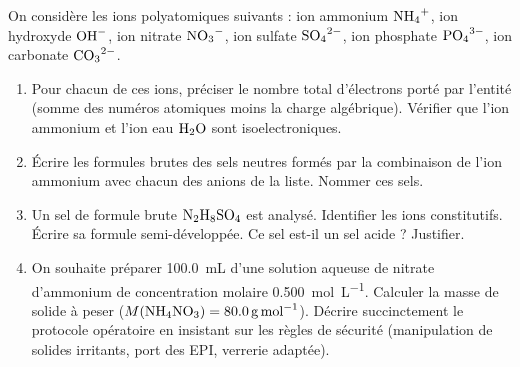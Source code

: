 \documentclass[11pt]{article}
\begin{document}
\begin{exercice}
On considère les ions polyatomiques suivants : ion ammonium $\ce{NH4+}$, ion hydroxyde $\ce{OH-}$, ion nitrate $\ce{NO3-}$, ion sulfate $\ce{SO4^{2-}}$, ion phosphate $\ce{PO4^{3-}}$, ion carbonate $\ce{CO3^{2-}}$.
\begin{enumerate}
    \item Pour chacun de ces ions, préciser le nombre total d'électrons porté par l'entité (somme des numéros atomiques moins la charge algébrique). Vérifier que l'ion ammonium et l'ion eau $\ce{H2O}$ sont isoelectroniques.
    \item Écrire les formules brutes des sels neutres formés par la combinaison de l'ion ammonium avec chacun des anions de la liste. Nommer ces sels.
    \item Un sel de formule brute $\ce{N2H8SO4}$ est analysé. Identifier les ions constitutifs. Écrire sa formule semi-développée. Ce sel est-il un sel acide ? Justifier.
    \item On souhaite préparer \SI{100,0}{mL} d'une solution aqueuse de nitrate d'ammonium de concentration molaire \SI{0,500}{mol.L^{-1}}. Calculer la masse de solide à peser ($M(\ce{NH4NO3}) = \SI{80,0}{g.mol^{-1}}$). Décrire succinctement le protocole opératoire en insistant sur les règles de sécurité (manipulation de solides irritants, port des EPI, verrerie adaptée).
\end{enumerate}
\end{exercice}
\end{document}
